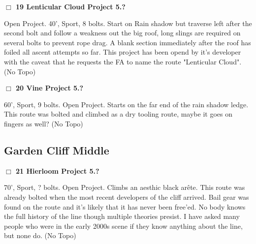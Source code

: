 \begin{multicols}{2}
\needspace{1.5cm}
\label{rt:Lenticular Cloud Project}
\colorbox{black!20}{
\parbox{0.95\linewidth}{
\hspace{-1ex}\textbf{$\Box$
19 Lenticular Cloud Project 5.?  
}}}
\begin{adjustwidth}{1.3em}{}			
Open Project. 40', Sport, 8 bolts. Start on Rain shadow but traverse left after the second bolt and follow a weakness out the big roof, long slings are required on several bolts to prevent rope drag. A blank section immediately after the roof has foiled all ascent attempts so far. This project has been opend by it's developer with the caveat that he requests the FA to name the route "Lenticular Cloud".
  (No Topo)
\end{adjustwidth}




\needspace{1.5cm}
\label{rt:Vine Project}
\colorbox{black!20}{
\parbox{0.95\linewidth}{
\hspace{-1ex}\textbf{$\Box$
20 Vine Project 5.?  
}}}
\begin{adjustwidth}{1.3em}{}			
60', Sport, 9 bolts. Open Project. Starts on the far end of the rain shadow ledge. This route was bolted and climbed as a dry tooling route, maybe it goes on fingers as well?
  (No Topo)
\end{adjustwidth}





\needspace{1.5cm}
\subsection*{Garden Cliff Middle}\label{bf:Garden Cliff Middle}
	


\needspace{1.5cm}
\label{rt:Hierloom Project}
\colorbox{black!20}{
\parbox{0.95\linewidth}{
\hspace{-1ex}\textbf{$\Box$
21 Hierloom Project 5.?  
}}}
\begin{adjustwidth}{1.3em}{}			
70', Sport, ? bolts. Open Project. Climbs an aesthic black arête. This route was already bolted when the most recent developers of the cliff arrived. Bail gear was found on the route and it's likely that it has never been free'ed. No body knows the full history of the line though multiple theories presist. I have asked many people who were in the early 2000s scene if they know anything about the line, but none do.
  (No Topo)
\end{adjustwidth}





\end{multicols}
